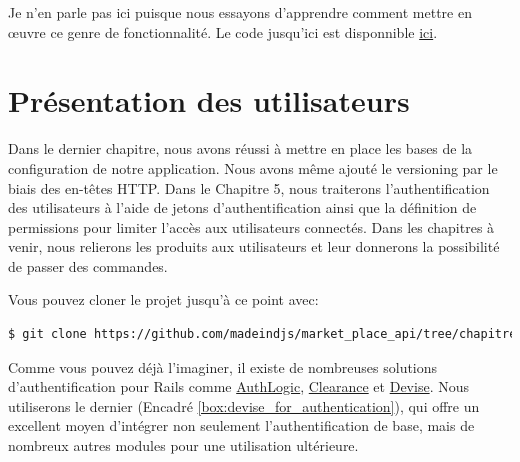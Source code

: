 \documentclass[]{report}
\begin{document}
    Je n'en parle pas ici puisque nous essayons d'apprendre comment mettre en œuvre ce genre de fonctionnalité. Le code jusqu'ici est disponnible \href{https://github.com/madeindjs/market_place_api/commit/124873774b578af3df21136df5ee80f4d50da3bd}{ici}.

\chapter{Présentation des utilisateurs}

  Dans le dernier chapitre, nous avons réussi à mettre en place les bases de la configuration de notre application. Nous avons même ajouté le versioning par le biais des en-têtes HTTP. Dans le Chapitre 5, nous traiterons l'authentification des utilisateurs à l'aide de jetons d'authentification ainsi que la définition de permissions pour limiter l'accès aux utilisateurs  connectés. Dans les chapitres à venir, nous relierons les produits aux utilisateurs et leur donnerons la possibilité de passer des commandes.

  Vous pouvez cloner le projet jusqu'à ce point avec:

  \begin{scriptsize}
  \begin{lstlisting}[language=bash]
  $ git clone https://github.com/madeindjs/market_place_api/tree/chapitre_2
  \end{lstlisting}
  \end{scriptsize}

  Comme vous pouvez déjà l'imaginer, il existe de nombreuses solutions d'authentification pour Rails comme \href{https://github.com/binarylogic/authlogic}{AuthLogic}, \href{https://github.com/thoughtbot/clearance}{Clearance} et \href{https://github.com/plataformatec/devise}{Devise}. Nous utiliserons le dernier (Encadré \ref{box:devise_for_authentication}), qui offre un excellent moyen d'intégrer non seulement l'authentification de base, mais de nombreux autres modules pour une utilisation ultérieure.
\end{document}
